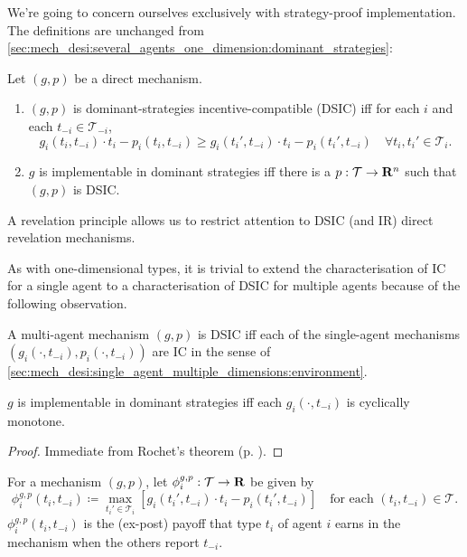 \documentclass[11pt,letterpaper,reqno,oneside]{article}
\begin{document}
We're going to concern ourselves exclusively with strategy-proof implementation. The definitions are unchanged from \cref{sec:mech_desi:several_agents_one_dimension:dominant_strategies}:
%
\begin{definition}
	Let $(g,p)$ be a direct mechanism.
	\begin{enumerate}

		\item $(g,p)$ is dominant-strategies incentive-compatible (DSIC) iff for each $i$ and each $t_{-i} \in \mathcal{T}_{-i}$,
		\begin{equation*}
			g_i(t_i,t_{-i}) \cdot t_i - p_i(t_i,t_{-i}) 
			\geq g_i(t_i',t_{-i}) \cdot t_i - p_i(t_i',t_{-i})
			\quad\forall t_i,t_i' \in \mathcal{T}_i .
		\end{equation*}

		\item $g$ is implementable in dominant strategies iff there is a $p : \mathcal{T} \to \mathbf{R}^n$ such that $(g,p)$ is DSIC.

	\end{enumerate}
\end{definition}
%
\noindent A revelation principle allows us to restrict attention to DSIC (and IR) direct revelation mechanisms.


As with one-dimensional types, it is trivial to extend the characterisation of IC for a single agent to a characterisation of DSIC for multiple agents because of the following observation.
%
\begin{observation}
	A multi-agent mechanism $(g,p)$ is DSIC iff each of the single-agent mechanisms $(g_i(\cdot,t_{-i}),p_i(\cdot,t_{-i}))$ are IC in the sense of \cref{sec:mech_desi:single_agent_multiple_dimensions:environment}.
\end{observation}


\begin{corollary}
	\label{corollary:implementable_monotone_DSIC}
	$g$ is implementable in dominant strategies iff each $g_i(\cdot,t_{-i})$ is cyclically monotone.
\end{corollary}

\begin{proof}
	Immediate from Rochet's theorem (p. \pageref{theorem:implementable_monotone}).
\end{proof}


For a mechanism $(g,p)$, let $\phi^{g,p}_i : \mathcal{T} \to \mathbf{R}$ be given by
%
\begin{equation*}
	\phi^{g,p}_i(t_i,t_{-i}) \coloneqq \max_{t_i' \in \mathcal{T}_i} 
	\left[ g_i(t_i',t_{-i}) \cdot t_i - p_i(t_i',t_{-i}) \right]
	\quad \text{for each $(t_i,t_{-i}) \in \mathcal{T}$} .
\end{equation*}
%
$\phi^{g,p}_i(t_i,t_{-i})$ is the (ex-post) payoff that type $t_i$ of agent $i$ earns in the mechanism when the others report $t_{-i}$.
\end{document}
